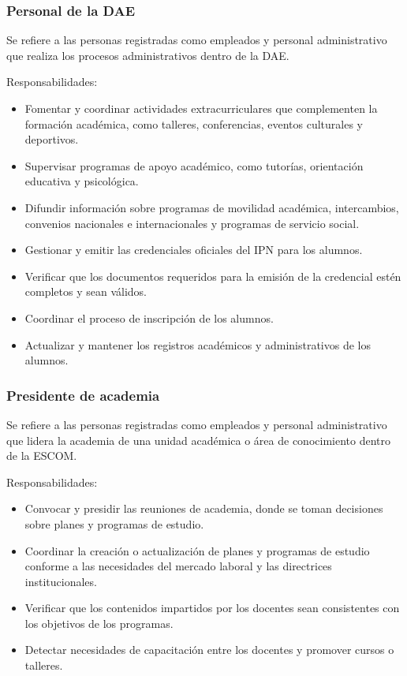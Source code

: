 \begin{Usuario}{\hypertarget{tPersonalDAE}{\subsubsection{Personal de la DAE}}}{
		Se refiere a las personas registradas como empleados y personal administrativo que realiza los procesos administrativos dentro de la DAE.
	}
	\item[Responsabilidades:] \cdtEmpty
	\begin{itemize}

		\item Fomentar y coordinar actividades extracurriculares que complementen la formación académica, como talleres, conferencias, eventos culturales y deportivos.
		\item Supervisar programas de apoyo académico, como tutorías, orientación educativa y psicológica.
		\item Difundir información sobre programas de movilidad académica, intercambios, convenios nacionales e internacionales y programas de servicio social.
		\item Gestionar y emitir las credenciales oficiales del IPN para los alumnos.
		\item Verificar que los documentos requeridos para la emisión de la credencial estén completos y sean válidos.
		\item Coordinar el proceso de inscripción de los alumnos.
		\item Actualizar y mantener los registros académicos y administrativos de los alumnos. 
	\end{itemize}


\end{Usuario}

\begin{Usuario}{\hypertarget{tPresidente}{\subsubsection{Presidente de academia}}}{
	Se refiere a las personas registradas como empleados y personal administrativo que lidera la academia de una unidad académica o área de conocimiento dentro de la ESCOM.
	}
	\item[Responsabilidades:] \cdtEmpty
	\begin{itemize}

		\item Convocar y presidir las reuniones de academia, donde se toman decisiones sobre planes y programas de estudio.
		\item Coordinar la creación o actualización de planes y programas de estudio conforme a las necesidades del mercado laboral y las directrices institucionales.
		\item Verificar que los contenidos impartidos por los docentes sean consistentes con los objetivos de los programas.
		\item Detectar necesidades de capacitación entre los docentes y promover cursos o talleres. 
	\end{itemize}

\end{Usuario}


